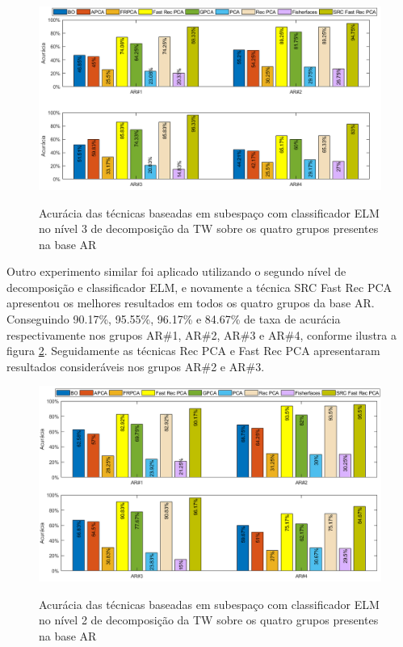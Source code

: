 \begin{figure}[H]
\centering
\caption{Acurácia das técnicas baseadas em subespaço com classificador ELM no nível 3 de decomposição da TW sobre os quatro grupos presentes na base AR}
\includegraphics[scale=0.60]{imgs4/acuracia_subespaco_ELM}
\label{fig:acuracia_ELM_AR_com_dois_contextos}
\end{figure}


Outro experimento similar foi aplicado utilizando o segundo nível de decomposição e classificador ELM, e novamente a técnica SRC Fast Rec PCA apresentou os melhores resultados em todos os quatro grupos da base AR. Conseguindo 90.17\%, 95.55\%, 96.17\% e 84.67\% de taxa de acurácia respectivamente nos grupos AR\#1, AR\#2, AR\#3 e AR\#4, conforme ilustra a figura \ref{fig:acuracia_ELM_AR_nivel2_subespaco}. Seguidamente as técnicas Rec PCA e Fast Rec PCA apresentaram resultados consideráveis nos grupos AR\#2 e AR\#3. 

\begin{figure}[H]
\centering
\caption{Acurácia das técnicas baseadas em subespaço com classificador ELM no nível 2 de decomposição da TW sobre os quatro grupos presentes na base AR}
\includegraphics[scale=0.60]{imgs4/acuracia/nivel_one_two/ELM_nivel_2_subespaco}
\label{fig:acuracia_ELM_AR_nivel2_subespaco}
\end{figure}


